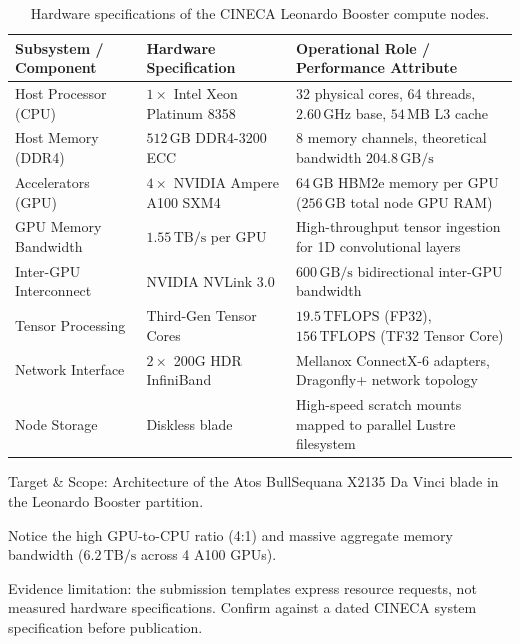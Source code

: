 \begin{table}[htbp]
  \centering
  \small
  \caption{Hardware specifications of the CINECA Leonardo Booster compute nodes.}
  \label{tab:leonardo_hardware}
  \begin{threeparttable}
    \begin{tabularx}{\linewidth}{l l X}
      \toprule
      \textbf{Subsystem / Component} & \textbf{Hardware Specification} & \textbf{Operational Role / Performance Attribute} \\
      \midrule
      Host Processor (CPU) & $1\times$ Intel Xeon Platinum 8358 & 32 physical cores, 64 threads, $2.60\,\mathrm{GHz}$ base, $54\,\mathrm{MB}$ L3 cache \\
      Host Memory (DDR4) & $512\,\mathrm{GB}$ DDR4-3200 ECC & 8 memory channels, theoretical bandwidth $204.8\,\mathrm{GB/s}$ \\
      Accelerators (GPU) & $4\times$ NVIDIA Ampere A100 SXM4 & $64\,\mathrm{GB}$ HBM2e memory per GPU ($256\,\mathrm{GB}$ total node GPU RAM) \\
      GPU Memory Bandwidth & $1.55\,\mathrm{TB/s}$ per GPU & High-throughput tensor ingestion for 1D convolutional layers \\
      Inter-GPU Interconnect & NVIDIA NVLink 3.0 & $600\,\mathrm{GB/s}$ bidirectional inter-GPU bandwidth \\
      Tensor Processing & Third-Gen Tensor Cores & $19.5\,\mathrm{TFLOPS}$ (FP32), $156\,\mathrm{TFLOPS}$ (TF32 Tensor Core) \\
      Network Interface & $2\times$ 200G HDR InfiniBand & Mellanox ConnectX-6 adapters, Dragonfly+ network topology \\
      Node Storage & Diskless blade & High-speed scratch mounts mapped to parallel Lustre filesystem \\
      \bottomrule
    \end{tabularx}
    \begin{tablenotes}[flushleft]
      \footnotesize
      \item Target \& Scope: Architecture of the Atos BullSequana X2135 Da Vinci blade in the Leonardo Booster partition.
      \item Notice the high GPU-to-CPU ratio (4:1) and massive aggregate memory bandwidth ($6.2\,\mathrm{TB/s}$ across 4 A100 GPUs).
      \item Evidence limitation: the submission templates express resource requests, not measured hardware specifications. Confirm against a dated CINECA system specification before publication.
    \end{tablenotes}
  \end{threeparttable}
\end{table}

